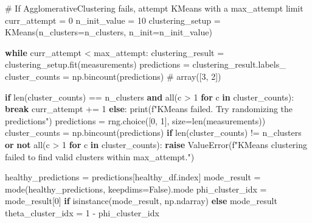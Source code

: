 \documentclass[
  letterpaper,
  DIV=11,
  numbers=noendperiod]{scrreprt}
\newenvironment{Shaded}{\begin{snugshade}}{\end{snugshade}}
\newcommand{\BuiltInTok}[1]{\textcolor[rgb]{0.00,0.23,0.31}{#1}}
\newcommand{\CommentTok}[1]{\textcolor[rgb]{0.37,0.37,0.37}{#1}}
\newcommand{\ControlFlowTok}[1]{\textcolor[rgb]{0.00,0.23,0.31}{\textbf{#1}}}
\newcommand{\DecValTok}[1]{\textcolor[rgb]{0.68,0.00,0.00}{#1}}
\newcommand{\KeywordTok}[1]{\textcolor[rgb]{0.00,0.23,0.31}{\textbf{#1}}}
\newcommand{\NormalTok}[1]{\textcolor[rgb]{0.00,0.23,0.31}{#1}}
\newcommand{\OperatorTok}[1]{\textcolor[rgb]{0.37,0.37,0.37}{#1}}
\newcommand{\PreprocessorTok}[1]{\textcolor[rgb]{0.68,0.00,0.00}{#1}}
\newcommand{\SpecialStringTok}[1]{\textcolor[rgb]{0.13,0.47,0.30}{#1}}
\newcommand{\VariableTok}[1]{\textcolor[rgb]{0.07,0.07,0.07}{#1}}
\begin{document}
\begin{Shaded}
\begin{Highlighting}[]
        \CommentTok{\# If AgglomerativeClustering fails, attempt KMeans with a max\_attempt limit}
\NormalTok{        curr\_attempt }\OperatorTok{=} \DecValTok{0}
\NormalTok{        n\_init\_value }\OperatorTok{=} \DecValTok{10}
\NormalTok{        clustering\_setup }\OperatorTok{=}\NormalTok{ KMeans(n\_clusters}\OperatorTok{=}\NormalTok{n\_clusters, n\_init}\OperatorTok{=}\NormalTok{n\_init\_value)}
        
        \ControlFlowTok{while}\NormalTok{ curr\_attempt }\OperatorTok{\textless{}}\NormalTok{ max\_attempt:}
\NormalTok{            clustering\_result }\OperatorTok{=}\NormalTok{ clustering\_setup.fit(measurements)}
\NormalTok{            predictions }\OperatorTok{=}\NormalTok{ clustering\_result.labels\_}
\NormalTok{            cluster\_counts }\OperatorTok{=}\NormalTok{ np.bincount(predictions) }\CommentTok{\# array([3, 2])}
            
            \ControlFlowTok{if} \BuiltInTok{len}\NormalTok{(cluster\_counts) }\OperatorTok{==}\NormalTok{ n\_clusters }\KeywordTok{and} \BuiltInTok{all}\NormalTok{(c }\OperatorTok{\textgreater{}} \DecValTok{1} \ControlFlowTok{for}\NormalTok{ c }\KeywordTok{in}\NormalTok{ cluster\_counts):}
                \ControlFlowTok{break} 
\NormalTok{            curr\_attempt }\OperatorTok{+=} \DecValTok{1}
        \ControlFlowTok{else}\NormalTok{:}
            \BuiltInTok{print}\NormalTok{(}\SpecialStringTok{f"KMeans failed. Try randomizing the predictions"}\NormalTok{)}
\NormalTok{            predictions }\OperatorTok{=}\NormalTok{ rng.choice([}\DecValTok{0}\NormalTok{, }\DecValTok{1}\NormalTok{], size}\OperatorTok{=}\BuiltInTok{len}\NormalTok{(measurements))}
\NormalTok{            cluster\_counts }\OperatorTok{=}\NormalTok{ np.bincount(predictions)}
            \ControlFlowTok{if} \BuiltInTok{len}\NormalTok{(cluster\_counts) }\OperatorTok{!=}\NormalTok{ n\_clusters }\KeywordTok{or} \KeywordTok{not} \BuiltInTok{all}\NormalTok{(c }\OperatorTok{\textgreater{}} \DecValTok{1} \ControlFlowTok{for}\NormalTok{ c }\KeywordTok{in}\NormalTok{ cluster\_counts):}
                \ControlFlowTok{raise} \PreprocessorTok{ValueError}\NormalTok{(}\SpecialStringTok{f"KMeans clustering failed to find valid clusters within max\_attempt."}\NormalTok{)}
    
\NormalTok{    healthy\_predictions }\OperatorTok{=}\NormalTok{ predictions[healthy\_df.index]}
\NormalTok{    mode\_result }\OperatorTok{=}\NormalTok{ mode(healthy\_predictions, keepdims}\OperatorTok{=}\VariableTok{False}\NormalTok{).mode}
\NormalTok{    phi\_cluster\_idx }\OperatorTok{=}\NormalTok{ mode\_result[}\DecValTok{0}\NormalTok{] }\ControlFlowTok{if} \BuiltInTok{isinstance}\NormalTok{(mode\_result, np.ndarray) }\ControlFlowTok{else}\NormalTok{ mode\_result}
\NormalTok{    theta\_cluster\_idx }\OperatorTok{=} \DecValTok{1} \OperatorTok{{-}}\NormalTok{ phi\_cluster\_idx}


\end{Highlighting}
\end{Shaded}
\end{document}
